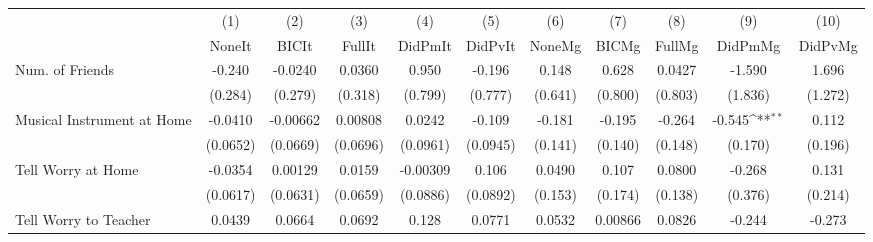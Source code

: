 {
\def\sym#1{\ifmmode^{#1}\else\(^{#1}\)\fi}
\begin{tabular}{l*{10}{c}}
\toprule
            &\multicolumn{1}{c}{(1)}&\multicolumn{1}{c}{(2)}&\multicolumn{1}{c}{(3)}&\multicolumn{1}{c}{(4)}&\multicolumn{1}{c}{(5)}&\multicolumn{1}{c}{(6)}&\multicolumn{1}{c}{(7)}&\multicolumn{1}{c}{(8)}&\multicolumn{1}{c}{(9)}&\multicolumn{1}{c}{(10)}\\
            &\multicolumn{1}{c}{NoneIt}&\multicolumn{1}{c}{BICIt}&\multicolumn{1}{c}{FullIt}&\multicolumn{1}{c}{DidPmIt}&\multicolumn{1}{c}{DidPvIt}&\multicolumn{1}{c}{NoneMg}&\multicolumn{1}{c}{BICMg}&\multicolumn{1}{c}{FullMg}&\multicolumn{1}{c}{DidPmMg}&\multicolumn{1}{c}{DidPvMg}\\
\midrule
Num. of Friends&      -0.240         &     -0.0240         &      0.0360         &       0.950         &      -0.196         &       0.148         &       0.628         &      0.0427         &      -1.590         &       1.696         \\
            &     (0.284)         &     (0.279)         &     (0.318)         &     (0.799)         &     (0.777)         &     (0.641)         &     (0.800)         &     (0.803)         &     (1.836)         &     (1.272)         \\
\addlinespace
Musical Instrument at Home&     -0.0410         &    -0.00662         &     0.00808         &      0.0242         &      -0.109         &      -0.181         &      -0.195         &      -0.264         &      -0.545\sym{**} &       0.112         \\
            &    (0.0652)         &    (0.0669)         &    (0.0696)         &    (0.0961)         &    (0.0945)         &     (0.141)         &     (0.140)         &     (0.148)         &     (0.170)         &     (0.196)         \\
\addlinespace
Tell Worry at Home&     -0.0354         &     0.00129         &      0.0159         &    -0.00309         &       0.106         &      0.0490         &       0.107         &      0.0800         &      -0.268         &       0.131         \\
            &    (0.0617)         &    (0.0631)         &    (0.0659)         &    (0.0886)         &    (0.0892)         &     (0.153)         &     (0.174)         &     (0.138)         &     (0.376)         &     (0.214)         \\
\addlinespace
Tell Worry to Teacher&      0.0439         &      0.0664         &      0.0692         &       0.128         &      0.0771         &      0.0532         &     0.00866         &      0.0826         &      -0.244         &      -0.273         \\

\end{tabular}}
